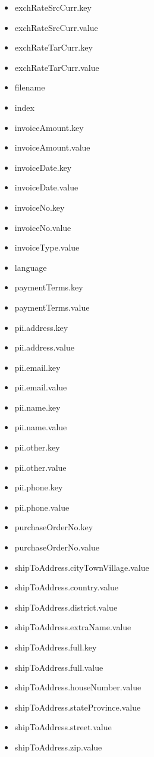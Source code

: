 \begin{multicols}{2}
\begin{itemize}
		\item[] exchRateSrcCurr.key
		\item[] exchRateSrcCurr.value
		\item[] exchRateTarCurr.key
		\item[] exchRateTarCurr.value
		\item[] filename
		\item[] index
		\item[] invoiceAmount.key
		\item[] invoiceAmount.value
		\item[] invoiceDate.key
		\item[] invoiceDate.value
		\item[] invoiceNo.key
		\item[] invoiceNo.value
		\item[] invoiceType.value
		\item[] language
		\item[] paymentTerms.key
		\item[] paymentTerms.value
		\item[] pii.address.key
		\item[] pii.address.value
		\item[] pii.email.key
		\item[] pii.email.value
		\item[] pii.name.key
		\item[] pii.name.value
		\item[] pii.other.key
		\item[] pii.other.value
		\item[] pii.phone.key
		\item[] pii.phone.value
		\item[] purchaseOrderNo.key
		\item[] purchaseOrderNo.value
		\item[] shipToAddress.cityTownVillage.value
		\item[] shipToAddress.country.value
		\item[] shipToAddress.district.value
		\item[] shipToAddress.extraName.value
		\item[] shipToAddress.full.key
		\item[] shipToAddress.full.value
		\item[] shipToAddress.houseNumber.value
		\item[] shipToAddress.stateProvince.value
		\item[] shipToAddress.street.value
		\item[] shipToAddress.zip.value

\end{itemize}
\end{multicols}
